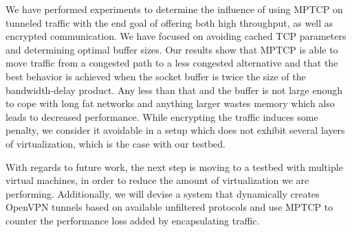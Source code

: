 
We have performed experiments to determine the influence of using MPTCP on
tunneled traffic with the end goal of offering both high throughput, as well
as encrypted communication. We have focused on avoiding cached TCP parameters
and determining optimal buffer sizes. Our results show that MPTCP is able to
move traffic from a congested path to a less congested alternative and that
the best behavior is achieved when the socket buffer is twice the size of the
bandwidth-delay product. Any less than that and the buffer is not large enough
to cope with long fat networks and anything larger wastes memory which also
leads to decreased performance. While encrypting the traffic induces some
penalty, we consider it avoidable in a setup which does not exhibit several
layers of virtualization, which is the case with our testbed.

With regards to future work, the next step is moving to a testbed with
multiple virtual machines, in order to reduce the amount of virtualization we
are performing. Additionally, we will devise a system that dynamically creates
OpenVPN tunnels based on available unfiltered protocols and use MPTCP to
counter the performance loss added by encapsulating traffic.
